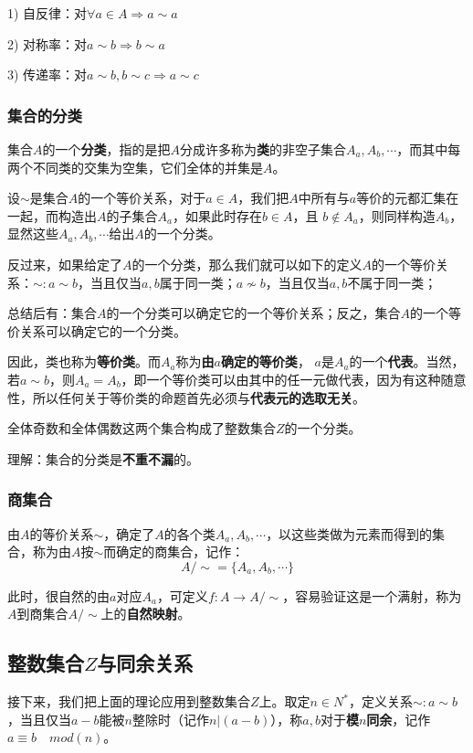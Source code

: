 \documentclass[12pt]{article}
\begin{document}
1) 自反律：对$\forall a \in A \Rightarrow a \sim a$

2) 对称率：对$a \sim b \Rightarrow b \sim a$

3) 传递率：对$a \sim b, b \sim c\Rightarrow a \sim c$

\subsubsection{集合的分类}
集合$A$的一个\textbf{分类}，指的是把$A$分成许多称为\textbf{类}的非空子集合$A_a, A_b, \cdots $，而其中每两个不同类的交集为空集，它们全体的并集是$A$。

设$\sim$是集合$A$的一个等价关系，对于$a\in A$，我们把$A$中所有与$a$等价的元都汇集在一起，而构造出$A$的子集合$A_a$，如果此时存在$b \in A$，且 $b \notin A_a$，则同样构造$A_b$，显然这些$A_a, A_b, \cdots $给出$A$的一个分类。

反过来，如果给定了$A$的一个分类，那么我们就可以如下的定义$A$的一个等价关系：$\sim: a \sim b$，当且仅当$a,b$属于同一类；$a \nsim b$，当且仅当$a,b$不属于同一类；

总结后有：集合$A$的一个分类可以确定它的一个等价关系；反之，集合$A$的一个等价关系可以确定它的一个分类。

因此，类也称为\textbf{等价类}。而$A_a$称为\textbf{由$a$确定的等价类}， $a$是$A_a$的一个\textbf{代表}。当然，若$a \sim b$，则$A_a = A_b$，即一个等价类可以由其中的任一元做代表，因为有这种随意性，所以任何关于等价类的命题首先必须与\textbf{代表元的选取无关}。

\begin{framed}
\small {
全体奇数和全体偶数这两个集合构成了整数集合$Z$的一个分类。

理解：集合的分类是\textbf{不重不漏}的。
}
\end{framed}

\subsubsection{商集合}
由$A$的等价关系$\sim$，确定了$A$的各个类$A_a, A_b, \cdots$，以这些类做为元素而得到的集合，称为由$A$按$\sim$而确定的商集合，记作：
$$
A / \sim = \{A_a, A_b, \cdots \}
$$

此时，很自然的由$a$对应$A_a$，可定义$f: A \rightarrow A/\sim$，容易验证这是一个满射，称为$A$到商集合$A/\sim$上的\textbf{自然映射}。

\subsection{整数集合$Z$与同余关系}
接下来，我们把上面的理论应用到整数集合$Z$上。取定$n\in N^*$，定义关系$\sim: a \sim b$，当且仅当$a-b$能被$n$整除时（记作$n|(a-b)$），称$a,b$对于\textbf{模$n$同余}，记作$ a \equiv b\quad mod(n)$。
\end{document}

